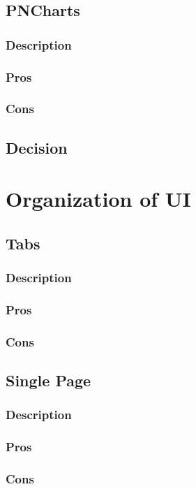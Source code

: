 \documentclass[onecolumn, draftclsnofoot,10pt, compsoc]{IEEEtran}
\begin{document}
\subsection{PNCharts}
\subsubsection*{Description}
\subsubsection*{Pros}
\subsubsection*{Cons}

\subsection{Decision}

\section{Organization of UI}

\subsection{Tabs}
\subsubsection*{Description}
\subsubsection*{Pros}
\subsubsection*{Cons}

\subsection{Single Page}
\subsubsection*{Description}
\subsubsection*{Pros}
\subsubsection*{Cons}
\end{document}
